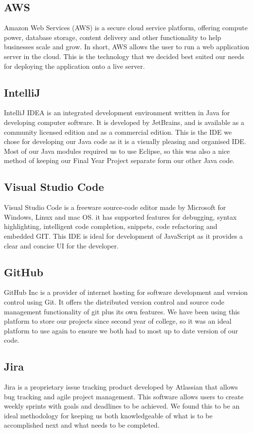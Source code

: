 \subsection{AWS}
Amazon Web Services (AWS) is a secure cloud service platform, offering compute power, database storage, content delivery and other functionality to help businesses scale and grow. In short, AWS allows the user to run a web application server in the cloud. This is the technology that we decided best suited our needs for deploying the application onto a live server.

\subsection{IntelliJ}
IntelliJ IDEA is an integrated development environment written in Java for developing computer software. It is developed by JetBrains, and is available as a community licensed edition and as a commercial edition. This is the IDE we chose for developing our Java code as it is a visually pleasing and organised IDE. Most of our Java modules required us to use Eclipse, so this was also a nice method of keeping our Final Year Project separate form our other Java code.

\subsection{Visual Studio Code}
Visual Studio Code is a freeware source-code editor made by Microsoft for Windows, Linux and mac OS. it has supported features for debugging, syntax highlighting, intelligent code completion, snippets, code refactoring and embedded GIT. This IDE is ideal for development of JavaScript as it provides a clear and concise UI for the developer.

\subsection{GitHub}
GitHub Inc is a provider of internet hosting for software development and version control using Git. It offers the distributed version control and source code management functionality of git plus its own features. We have been using this platform to store our projects since second year of college, so it was an ideal platform to use again to ensure we both had to most up to date version of our code.

\subsection{Jira}
Jira is a proprietary issue tracking product developed by Atlassian that allows bug tracking and agile project management. This software allows users to create weekly sprints with goals and deadlines to be achieved. We found this to be an ideal methodology for keeping us both knowledgeable of what is to be accomplished next and what needs to be completed.

